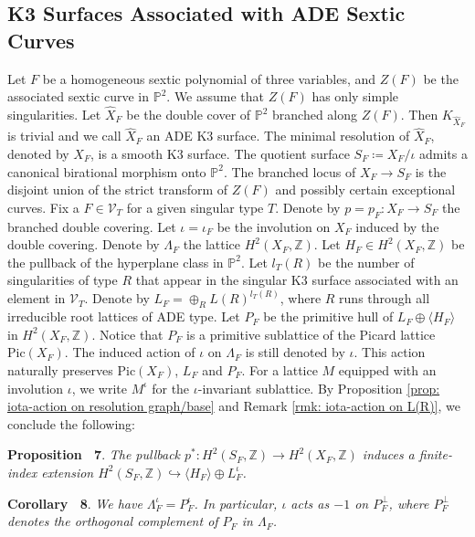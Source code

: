 \documentclass[
]{article}
\begin{document}
\subsection{K3 Surfaces Associated with ADE Sextic
Curves}\label{subsection:ux20ADEux20K3}

Let \(F\) be a homogeneous sextic polynomial of three variables, and
\(Z(F)\) be the associated sextic curve in \(\mathbb{P}^2\). We assume
that \(Z(F)\) has only simple singularities. Let \(\widehat{X}_F\) be
the double cover of \(\mathbb{P}^2\) branched along \(Z(F)\). Then
\(K_{\widehat{X}_F}\) is trivial and we call \(\widehat{X}_F\) an ADE K3
surface. The minimal resolution of \(\widehat{X}_F\), denoted by
\(X_F\), is a smooth K3 surface. The quotient surface
\(S_F\coloneqq X_F/\iota\) admits a canonical birational morphism onto
\(\mathbb{P}^2\). The branched locus of \(X_F\to S_F\) is the disjoint
union of the strict transform of \(Z(F)\) and possibly certain
exceptional curves. Fix a \(F\in \mathcal{V}_{T}\) for a given singular
type \(T\). Denote by \(p=p_F\colon X_F\to S_F\) the branched double
covering. Let \(\iota=\iota_F\) be the involution on \(X_F\) induced by
the double covering. Denote by \(\Lambda_F\) the lattice
\(H^2(X_F, \mathbb{Z})\). Let \(H_F\in H^2(X_F, \mathbb{Z})\) be the
pullback of the hyperplane class in \(\mathbb{P}^2\). Let \(l_{T}(R)\)
be the number of singularities of type \(R\) that appear in the singular
K3 surface associated with an element in \(\mathcal{V}_{T}\). Denote by
\(L_F=\oplus_R L(R)^{l_{T}(R)}\), where \(R\) runs through all
irreducible root lattices of ADE type. Let \(P_F\) be the primitive hull
of \(L_F\oplus \langle H_F\rangle\) in \(H^2(X_F,\mathbb{Z})\). Notice
that \(P_F\) is a primitive sublattice of the Picard lattice
\(\mathrm{Pic}(X_F)\). The induced action of \(\iota\) on \(\Lambda_F\)
is still denoted by \(\iota\). This action naturally preserves
\(\mathrm{Pic}(X_F)\), \(L_F\) and \(P_F\). For a lattice \(M\) equipped
with an involution \(\iota\), we write \(M^{\iota}\) for the
\(\iota\)-invariant sublattice. By Proposition
\ref{prop: iota-action on resolution graph/base} and Remark
\ref{rmk: iota-action on L(R)}, we conclude the following:

\textbf{Proposition~ 7}.
\emph{\label{prop: finite index H^2(S) to H oplus L^iota} The pullback
\(p^*\colon H^2(S_F,\mathbb{Z})\to H^2(X_F,\mathbb{Z})\) induces a
finite-index extension
\(H^2(S_F,\mathbb{Z})\hookrightarrow \langle H_F \rangle\oplus L_F^{\iota}\).}

\textbf{Corollary~ 8}. \emph{\label{cor: Lambda_F^iota = P_F^iota} We
have \(\Lambda_F^\iota = P_F^\iota\). In particular, \(\iota\) acts as
\(-1\) on \(P_F^\perp\), where \(P_F^\perp\) denotes the orthogonal
complement of \(P_F\) in \(\Lambda_F\).}
\end{document}
